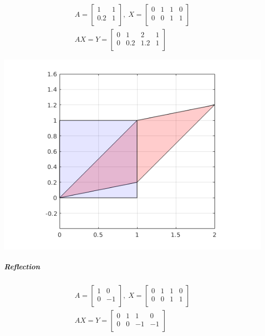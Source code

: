 \documentclass[MathsNotesBase.tex]{subfiles}
\begin{document}
{		\begin{align*}
		A =
		\begin{bmatrix}    
		1  &  1 \\
		0.2  &  1 \\		
		\end{bmatrix}
		,\; X = 
		\begin{bmatrix}  
		0   &  1  &   1  &   0 \\
		0   &  0  &   1  &   1	\\	
		\end{bmatrix} \\[10pt]
		AX = Y = 
		\begin{bmatrix}   
		0  &   1  &  2  &  1 \\
		0  &   0.2  &  1.2  &  1 \\
		\end{bmatrix}
		\end{align*}
	
		\begin{center}
		\includegraphics[scale=0.85]{resources/img/GeometryOfMatrices_images/shearing2.png}
		\end{center}
		
		\subparagraph{Reflection}
		\begin{align*}
		A =
		\begin{bmatrix}    
		1  &  0 \\
		0  &  -1 \\		
		\end{bmatrix}
		,\; X = 
		\begin{bmatrix}  
		0   &  1  &   1  &   0 \\
		0   &  0  &   1  &   1	\\	
		\end{bmatrix} \\[10pt]
		AX = Y = 
		\begin{bmatrix}   
		0  &   1  &  1  &  0 \\
		0  &   0  &  -1  &  -1 \\
		\end{bmatrix}
		\end{align*}
	
}
\end{document}
